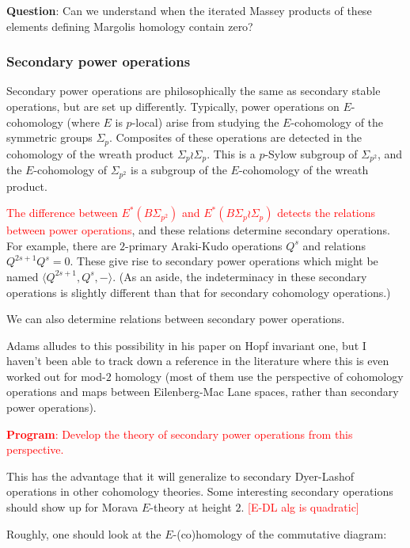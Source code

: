 \documentclass[12pt,titlepage]{article}
\newcommand{\rd}[1]{{\textcolor{red}{#1}}}
\theoremstyle{plain}
\theoremstyle{definition}
\theoremstyle{remark}
\begin{document}
\textbf{Question}: Can we understand when the iterated Massey products of these elements defining Margolis homology contain zero?

\hypertarget{secondary_power_operations_4}{}\subsubsection{{Secondary power operations}}\label{secondary_power_operations_4}

Secondary power operations are philosophically the same as secondary stable operations, but are set up differently. Typically, power operations on $E$-cohomology (where $E$ is $p$-local) arise from studying the $E$-cohomology of the symmetric groups $\Sigma_p$. Composites of these operations are detected in the cohomology of the wreath product $\Sigma_p \wr \Sigma_p$. This is a $p$-Sylow subgroup of $\Sigma_{p^2}$, and the $E$-cohomology of $\Sigma_{p^2}$ is a subgroup of the $E$-cohomology of the wreath product.

\rd{The difference between $E^*(B\Sigma_{p^2})$ and $E^*(B\Sigma_p
\wr \Sigma_p)$ detects the relations between power operations}, and these relations determine secondary operations. For example, there are $2$-primary Araki-Kudo operations $Q^s$ and relations $Q^{2s+1} Q^s = 0$. These give rise to secondary power operations which might be named $\langle Q^{2s+1}, Q^s, -\rangle$. (As an aside, the indeterminacy in these secondary operations is slightly different than that for secondary cohomology operations.)

We can also determine relations between secondary power operations.

Adams alludes to this possibility in his paper on Hopf invariant one, but I haven'{}t been able to track down a reference in the literature where this is even worked out for mod-$2$ homology (most of them use the perspective of cohomology operations and maps between Eilenberg-Mac Lane spaces, rather than secondary power operations).

\rd{\textbf{Program}: Develop the theory of secondary power operations from this perspective.}

This has the advantage that it will generalize to secondary Dyer-Lashof operations in other cohomology theories. Some interesting secondary operations should show up for Morava $E$-theory at height $2$. 
\rd{[E-DL alg is quadratic]}

Roughly, one should look at the $E$-(co)homology of the commutative diagram:
\end{document}

